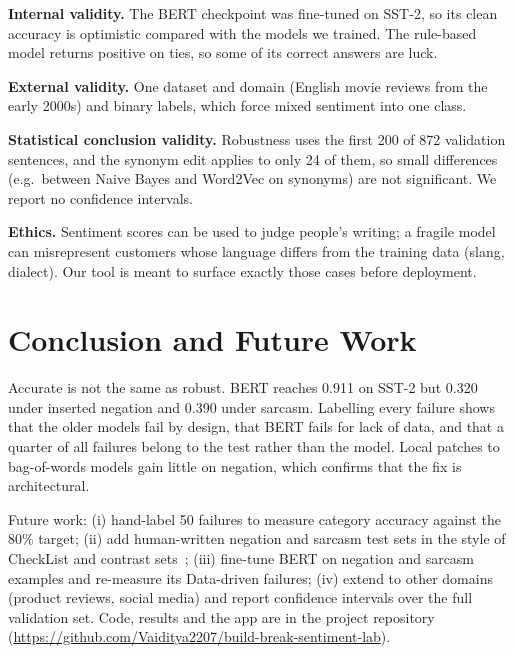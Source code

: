 \documentclass[conference]{IEEEtran}
\begin{document}
\textbf{Internal validity.} The BERT checkpoint was fine-tuned on SST-2, so its clean accuracy is
optimistic compared with the models we trained. The rule-based model returns positive on ties, so
some of its correct answers are luck.

\textbf{External validity.} One dataset and domain (English movie reviews from the early 2000s) and
binary labels, which force mixed sentiment into one class.

\textbf{Statistical conclusion validity.} Robustness uses the first 200 of 872 validation
sentences, and the synonym edit applies to only 24 of them, so small differences (e.g.\ between
Naive Bayes and Word2Vec on synonyms) are not significant. We report no confidence intervals.

\textbf{Ethics.} Sentiment scores can be used to judge people's writing; a fragile model can
misrepresent customers whose language differs from the training data (slang, dialect). Our tool is
meant to surface exactly those cases before deployment.

\section{Conclusion and Future Work}\label{sec:concl}
Accurate is not the same as robust. BERT reaches 0.911 on SST-2 but 0.320 under inserted negation
and 0.390 under sarcasm. Labelling every failure shows that the older models fail by design, that
BERT fails for lack of data, and that a quarter of all failures belong to the test rather than the
model. Local patches to bag-of-words models gain little on negation, which confirms that the fix is
architectural.

Future work: (i) hand-label 50 failures to measure category accuracy against the 80\% target;
(ii) add human-written negation and sarcasm test sets in the style of CheckList and contrast
sets~\cite{ribeiro2020,gardner2020}; (iii) fine-tune BERT on negation and sarcasm examples and
re-measure its Data-driven failures; (iv) extend to other domains (product reviews, social media)
and report confidence intervals over the full validation set. Code, results and the app are in the
project repository (\url{https://github.com/Vaiditya2207/build-break-sentiment-lab}).
\end{document}
